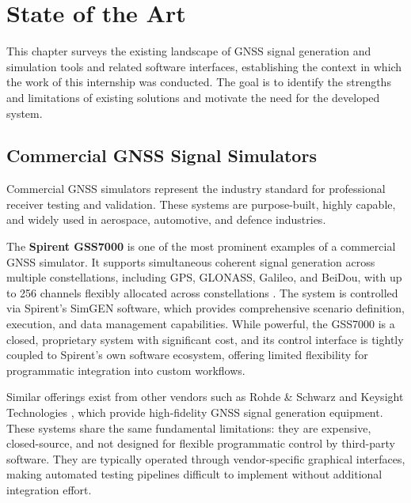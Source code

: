 
%

\chapter{State of the Art}
\label{cha:state-of-the-art}

This chapter surveys the existing landscape of \gls{GNSS} signal generation and
simulation tools and related software interfaces, establishing the context in
which the work of this internship was conducted. The goal is to identify the
strengths and limitations of existing solutions and motivate the need for the
developed system.

\section{Commercial GNSS Signal Simulators}

Commercial \gls{GNSS} simulators represent the industry standard for
professional receiver testing and validation. These systems are purpose-built,
highly capable, and widely used in aerospace, automotive, and defence
industries.

The \textbf{Spirent GSS7000} is one of the most prominent examples of a
commercial \gls{GNSS} simulator. It supports simultaneous coherent signal
generation across multiple constellations, including \gls{GPS}, \gls{GLONASS},
\gls{Galileo}, and \gls{BeiDou}, with up to 256 channels flexibly allocated
across constellations \cite{spirentGSS7000}\cite{spirentGSS7000Federal}. The
system is controlled via Spirent's SimGEN software, which provides
comprehensive scenario definition, execution, and data management capabilities.
While powerful, the GSS7000 is a closed, proprietary system with significant
cost, and its control interface is tightly coupled to Spirent's own software
ecosystem, offering limited flexibility for programmatic integration into
custom workflows.

Similar offerings exist from other vendors such as Rohde \& Schwarz
\cite{rohdeSchwarzSMBV100B} and Keysight Technologies \cite{keysightN7609B},
which provide high-fidelity \gls{GNSS} signal generation equipment. These
systems share the same fundamental limitations: they are expensive,
closed-source, and not designed for flexible programmatic control by
third-party software. They are typically operated through vendor-specific
graphical interfaces, making automated testing pipelines difficult to implement
without additional integration effort.

